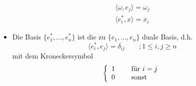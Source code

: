 \documentclass[ngerman]{tudscrreprt}
\begin{document}
\begin{itemize}
\begin{equation*}
\begin{matrix}
\end{matrix}
\end{equation*}
\begin{equation*}
\begin{matrix}
\langle \omega, e_j \rangle = \omega_j \\ 
\langle e_i^*, x\rangle = x_i
\end{matrix}
\end{equation*}
\item Die Basis $\{e_1^*, \dots, e_n^*\}$ ist die zu $\{ e_1, \dots, e_n \}$ duale Basis, d.h. 
\begin{equation*}
\langle e_i^*, e_j \rangle = \delta_{ij} \qquad ; 1\le i, j\ge n
\end{equation*}
mit dem Kroneckersymbol 
\begin{equation*}
\left\{ 
  \begin{array}{l l}
    1 & \quad \text{ für } i = j\\
    0 & \quad \text{ sonst }
  \end{array} \right.
\end{equation*}
\end{itemize}
\end{document}

